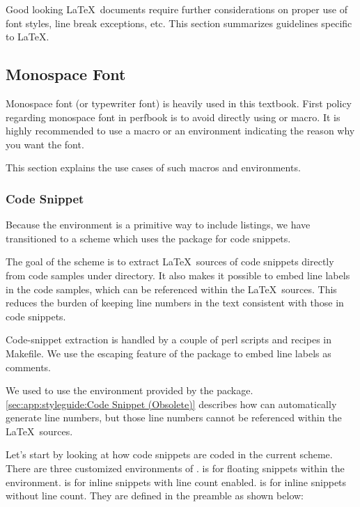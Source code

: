 Good looking \LaTeX\ documents require further considerations
on proper use of font styles, line break exceptions, etc.
This section summarizes guidelines specific to \LaTeX.

\subsection{Monospace Font}
\label{sec:app:styleguide:Monospace Font}

Monospace font (or typewriter font) is heavily used in this textbook.
First policy regarding monospace font in perfbook is to avoid
directly using \qco{\\texttt} or \qco{\\tt} macro.
It is highly recommended to use a macro or an environment
indicating the reason why you want the font.

This section explains the use cases of such macros and environments.

\subsubsection{Code Snippet}
\label{sec:app:styleguide:Code Snippet}

Because the  environment is a primitive way to include
listings, we have transitioned to a scheme which uses
the  package for code snippets.

The goal of the scheme is to extract \LaTeX\ sources of
code snippets directly from code samples under 
directory.
It also makes it possible to embed line labels in the code samples,
which can be referenced within the \LaTeX\ sources.
This reduces the burden of keeping line numbers
in the text consistent with those in code snippets.

Code-snippet extraction is handled by a couple of
perl scripts and recipes in Makefile.
We use the escaping feature of the  package
to embed line labels as comments.

We used to use the  environment provided
by the  package.
\cref{sec:app:styleguide:Code Snippet (Obsolete)} describes how
 can automatically generate line numbers,
but those line numbers cannot be referenced within the \LaTeX\ sources.

Let's start by looking at how code snippets are coded in the current scheme.
There are three customized environments of .
 is for floating snippets within the 
environment.  is for inline snippets with line count
enabled.  is for inline snippets without line count.
They are defined in the preamble as shown below:


